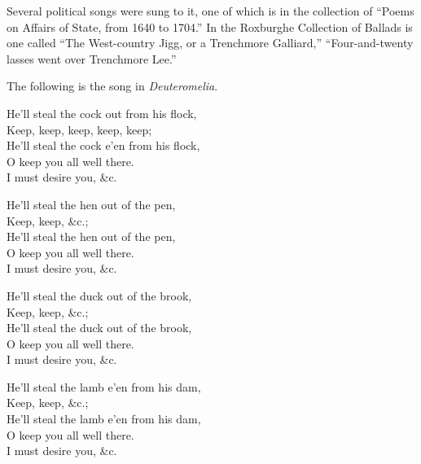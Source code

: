 Several political songs were sung to it, one of which is in the collection of
“Poems on Affairs of State, from 1640 to 1704.” In the Roxburghe Collection
of Ballads is one called “The West-country Jigg, or a Trenchmore Galliard,”
“Four-and-twenty lasses went over Trenchmore Lee.”

The following is the song in \textit{Deuteromelia}.


\smallskip



\normalsize

\pagebreak

\settowidth{\versewidth}{He’ll steal the cock out from his flock,}
\begin{dcverse}\begin{patverse}
He’ll steal the cock out from his flock,\\
Keep, keep, keep, keep, keep;\\
He'll steal the cock e’en from his flock,\\
O keep you all well there.\\
I must desire you, \&c.
\end{patverse}

\begin{patverse}
He’ll steal the hen out of the pen,\\
Keep, keep, \&c.;\\
He’ll steal the hen out of the pen,\\
O keep you all well there.\\
I must desire you, \&c.
\end{patverse}

\begin{patverse}
He’ll steal the duck out of the brook,\\
Keep, keep, \&c.;\\
He’ll steal the duck out of the brook,\\
O keep you all well there.\\
I must desire you, \&c.
\end{patverse}

\begin{patverse}
He’ll steal the lamb e’en from his dam,\\
Keep, keep, \&c.;\\
He’ll steal the lamb e’en from his dam,\\
O keep you all well there.\\
I must desire you, \&c.
\end{patverse}
\end{dcverse}


